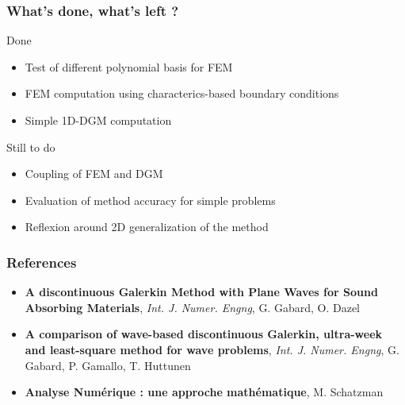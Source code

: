 \documentclass[10pt, compress]{beamer}
\begin{document}
\begin{frame}
    \frametitle{What's done, what's left ?}

    \begin{block}{Done}
        \begin{itemize}
            \item Test of different polynomial basis for FEM
            \item FEM computation using characterics-based boundary conditions
            \item Simple 1D-DGM computation
        \end{itemize}
    \end{block}
    \pause
    \begin{block}{Still to do}
        \begin{itemize}
            \item Coupling of FEM and DGM
            \item Evaluation of method accuracy for simple problems
            \item Reflexion around 2D generalization of the method
        \end{itemize}
    \end{block}
\end{frame}

\begin{frame}
    \frametitle{References}

    \begin{itemize}
        \item \textbf{A discontinuous Galerkin Method with Plane Waves for Sound Absorbing Materials}, \textit{Int. J.
            Numer. Engng}, G. Gabard, O.  Dazel
        \item \textbf{A comparison of wave-based discontinuous Galerkin, ultra-week and least-square method for wave
            problems}, \textit{Int. J.
            Numer. Engng}, G. Gabard, P. Gamallo, T. Huttunen
        \item \textbf{Analyse Numérique : une approche mathématique}, M. Schatzman
    \end{itemize}
\end{frame}
\end{document}
